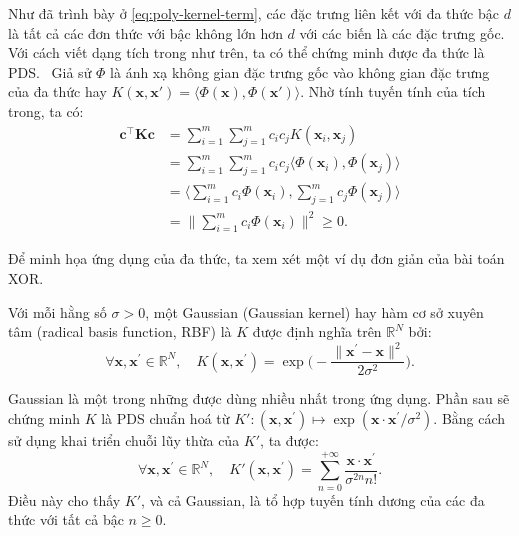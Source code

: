 \begin{exmp}
  Như đã trình bày ở \eqref{eq:poly-kernel-term}, các đặc trưng liên kết với
   đa thức bậc $d$ là tất cả các đơn thức với bậc không lớn hơn $d$
  với các biến là các đặc trưng gốc. Với cách viết dạng tích trong như trên, ta
  có thể chứng minh được  đa thức là  PDS. \elaborate~Giả
  sử $\Phi$ là ánh xạ không gian đặc trưng gốc vào không gian đặc
  trưng của  đa thức hay $K(\mathbf{x},\mathbf{x}') =
  \bigl\langle\Phi(\mathbf{x}), \Phi(\mathbf{x}')\bigr\rangle$. Nhờ tính tuyến
  tính của tích trong, ta có: \begin{align}
    \mathbf{c}^\intercal\mathbf{K}\mathbf{c} &=
      \sum_{i=1}^m\sum_{j=1}^mc_ic_jK(\mathbf{x}_i,\mathbf{x}_j) \\
    &= \sum_{i=1}^m\sum_{j=1}^mc_ic_j \bigl\langle \Phi(\mathbf{x}_i),
      \Phi(\mathbf{x}_j) \bigr\rangle \\
    &= \biggl\langle \sum_{i=1}^mc_i\Phi(\mathbf{x}_i),
      \sum_{j=1}^m c_j\Phi(\mathbf{x}_j) \biggr\rangle \\
    &= \biggl\lVert \sum_{i = 1}^m c_i\Phi(\mathbf{x}_i)\biggr\rVert^2 \ge 0.
  \end{align}

  Để minh họa ứng dụng của  đa thức, ta xem xét một ví dụ đơn giản
  của bài toán XOR.
\end{exmp}

\begin{exmp}
  Với mỗi hằng số $\sigma > 0$, một  Gaussian (Gaussian kernel) hay
  hàm cơ sở xuyên tâm (radical basis function, RBF) là  $K$ được
  định nghĩa trên $\mathbb{R}^N$ bởi: \begin{equation}
    \forall\mathbf{x}, \mathbf{x}^\prime \in \mathbb{R}^N,\quad K(\mathbf{x},
    \mathbf{x}^\prime) = \exp\biggl(-\frac{\lVert \mathbf{x}^\prime -
    \mathbf{x} \rVert^2}{2\sigma^2}\biggr).
  \end{equation}

   Gaussian là một trong những  được dùng nhiều nhất
  trong ứng dụng. Phần sau sẽ chứng minh $K$ là  PDS chuẩn hoá từ
   $K'\colon (\mathbf{x},\mathbf{x}^\prime) \mapsto \exp(
  \mathbf{x}\cdot\mathbf{x}^\prime / \sigma^2)$. Bằng cách sử dụng khai triển
  chuỗi lũy thừa của $K'$, ta được: \begin{equation}
    \forall \mathbf{x}, \mathbf{x}^\prime \in \mathbb{R}^N, \quad
    K'(\mathbf{x}, \mathbf{x}^\prime) = \sum_{n=0}^{+\infty}\frac{
      \mathbf{x}\cdot\mathbf{x}^\prime }{\sigma^{2n}n!}.
  \end{equation}Điều này cho thấy  $K'$, và cả  Gaussian,
  là tổ hợp tuyến tính dương của các  đa thức với tất cả bậc $n\ge
  0$.
\end{exmp}

